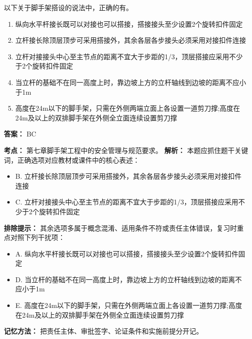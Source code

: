 \documentclass[UTF8,fontset=fandol,11pt]{ctexart}
\begin{document}
\begin{quizbox}[title={第 1 题}]
以下关于脚手架搭设的说法中，正确的有。\\
\begin{enumerate}[label=\Alph*.]
\item 纵向水平杆接长既可以对接也可以搭接，搭接接头至少设置2个旋转扣件固定
\item 立杆接长除顶层顶步可采用搭接外，其余各层各步接头必须采用对接扣件连接
\item 立杆对接接头中心至主节点的距离不宜大于步距的1/3，顶层搭接应采用不少于2个旋转扣件固定
\item 当立杆的基础不在同一高度上时，靠边坡上方的立杆轴线到边坡的距离不应小于1m
\item 高度在24m以下的脚手架，只需在外侧两端立面上各设置一道剪刀撑;高度在24m及以上的双排脚手架在外侧全立面连续设置剪刀撑
\end{enumerate}
\textbf{答案：} BC
\vspace{0.25em}
\begin{answerbox}[title={考点解析}]
\textbf{考点：} 第七章脚手架工程中的安全管理与规范要求。
\textbf{解析：} 本题应抓住题干关键词，正确选项对应教材或课件中的核心表述：
\begin{itemize}
\item B. 立杆接长除顶层顶步可采用搭接外，其余各层各步接头必须采用对接扣件连接
\item C. 立杆对接接头中心至主节点的距离不宜大于步距的1/3，顶层搭接应采用不少于2个旋转扣件固定
\end{itemize}
\textbf{排除提示：} 其余选项多属于概念混淆、适用条件不符或责任主体错误，复习时重点对照下列干扰项：
\begin{itemize}
\item A. 纵向水平杆接长既可以对接也可以搭接，搭接接头至少设置2个旋转扣件固定
\item D. 当立杆的基础不在同一高度上时，靠边坡上方的立杆轴线到边坡的距离不应小于1m
\item E. 高度在24m以下的脚手架，只需在外侧两端立面上各设置一道剪刀撑;高度在24m及以上的双排脚手架在外侧全立面连续设置剪刀撑
\end{itemize}
\textbf{记忆方法：} 把责任主体、审批签字、论证条件和实施前提分开记。
\end{answerbox}
\end{quizbox}

\vspace{0.2em}
\end{document}
